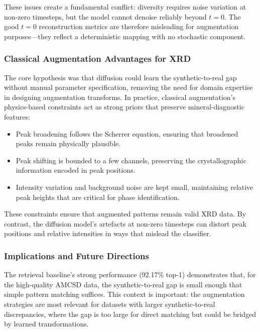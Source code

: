 These issues create a fundamental conflict: diversity requires noise variation at non-zero timesteps, but the model cannot denoise reliably beyond $t{=}0$.
The good $t{=}0$ reconstruction metrics are therefore misleading for augmentation purposes---they reflect a deterministic mapping with no stochastic component.


\subsubsection{Classical Augmentation Advantages for XRD}

The core hypothesis was that diffusion could learn the synthetic-to-real gap without manual parameter specification, removing the need for domain expertise in designing augmentation transforms.
In practice, classical augmentation's physics-based constraints act as strong priors that preserve mineral-diagnostic features:

\begin{itemize}
    \item Peak broadening follows the Scherrer equation, ensuring that broadened peaks remain physically plausible.
    \item Peak shifting is bounded to a few channels, preserving the crystallographic information encoded in peak positions.
    \item Intensity variation and background noise are kept small, maintaining relative peak heights that are critical for phase identification.
\end{itemize}

These constraints ensure that augmented patterns remain valid XRD data.
By contrast, the diffusion model's artefacts at non-zero timesteps can distort peak positions and relative intensities in ways that mislead the classifier.


\subsubsection{Implications and Future Directions}

The retrieval baseline's strong performance (92.17\% top-1) demonstrates that, for the high-quality AMCSD data, the synthetic-to-real gap is small enough that simple pattern matching suffices.
This context is important: the augmentation strategies are most relevant for datasets with larger synthetic-to-real discrepancies, where the gap is too large for direct matching but could be bridged by learned transformations.

